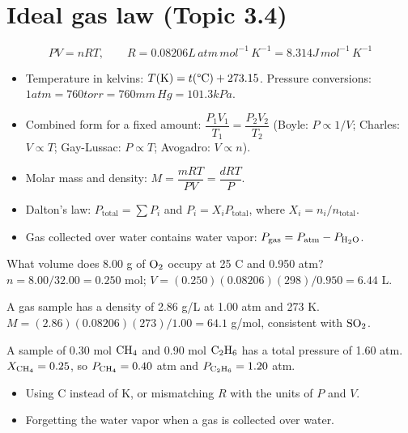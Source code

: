 \documentclass[11pt]{article}
\begin{document}
\section{Ideal gas law (Topic 3.4)}\label{t:3.4}
\[ PV = nRT, \qquad R = 0.08206\unit{L\,atm\,mol^{-1}\,K^{-1}} = 8.314\unit{J\,mol^{-1}\,K^{-1}} \]
\begin{itemize}
\item Temperature in kelvins: $T(\mathrm{K}) = t(\text{\textdegree C}) + 273.15$. Pressure conversions: $1\unit{atm} = 760\unit{torr} = 760\unit{mm\,Hg} = 101.3\unit{kPa}$.
\item Combined form for a fixed amount: $\dfrac{P_1V_1}{T_1} = \dfrac{P_2V_2}{T_2}$ (Boyle: $P \propto 1/V$; Charles: $V \propto T$; Gay-Lussac: $P \propto T$; Avogadro: $V \propto n$).
\item Molar mass and density: $M = \dfrac{mRT}{PV} = \dfrac{dRT}{P}$.
\item Dalton's law: $P_{\text{total}} = \sum P_i$ and $P_i = X_i P_{\text{total}}$, where $X_i = n_i/n_{\text{total}}$.
\item Gas collected over water contains water vapor: $P_{\text{gas}} = P_{\text{atm}} - P_{\ce{H2O}}$.
\end{itemize}
 What volume does 8.00 g of $\ce{O2}$ occupy at 25 \textdegree C and 0.950 atm? $n = 8.00/32.00 = 0.250$ mol; $V = (0.250)(0.08206)(298)/0.950 = 6.44$ L.

 A gas sample has a density of 2.86 g/L at 1.00 atm and 273 K. $M = (2.86)(0.08206)(273)/1.00 = 64.1$ g/mol, consistent with $\ce{SO2}$.

 A sample of 0.30 mol $\ce{CH4}$ and 0.90 mol $\ce{C2H6}$ has a total pressure of 1.60 atm. $X_{\ce{CH4}} = 0.25$, so $P_{\ce{CH4}} = 0.40$ atm and $P_{\ce{C2H6}} = 1.20$ atm.

\errorsh
\begin{itemize}
\item Using \textdegree C instead of K, or mismatching $R$ with the units of $P$ and $V$.
\item Forgetting the water vapor when a gas is collected over water.
\end{itemize}
\end{document}
